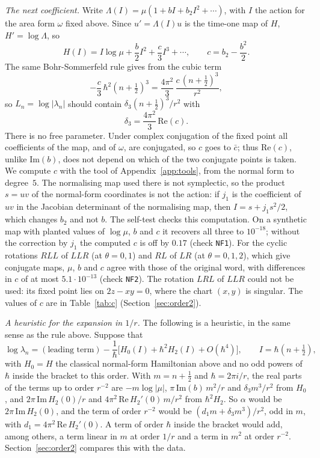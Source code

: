 \documentclass[11pt]{amsart}
\theoremstyle{definition}
\theoremstyle{remark}
\begin{document}
\emph{The next coefficient.} Write $\Lambda(I) = \mu(1 + bI + b_2I^2 + \cdots)$, with
$I$ the action for the area form $\omega$ fixed above. Since $u' = \Lambda(I)u$ is the
time-one map of $H$, $H' = \log\Lambda$, so
\[
H(I) = I\log\mu + \frac{b}{2}I^2 + \frac{c}{3}I^3 + \cdots, \qquad c = b_2 - \frac{b^2}{2}.
\]
The same Bohr-Sommerfeld rule gives from the cubic term
\[
-\frac{c}{3}\,\hbar^2\left(n+\tfrac12\right)^3 = \frac{4\pi^2}{3}\,
\frac{c\,(n+\frac12)^3}{r^2},
\]
so $L_n = \log|\lambda_n|$ should contain $\delta_3(n+\frac12)^3/r^2$ with
\begin{equation}\label{eq:delta3}
\delta_3 = \frac{4\pi^2}{3}\,\mathrm{Re}(c).
\end{equation}
There is no free parameter. Under complex conjugation of the fixed point all
coefficients of the map, and of $\omega$, are conjugated, so $c$ goes to $\bar c$; thus
$\mathrm{Re}(c)$, unlike $\mathrm{Im}(b)$, does not depend on which of the two
conjugate points is taken. We compute $c$ with the tool of Appendix~\ref{app:tools},
from the normal form to degree~$5$. The normalising map used there is not symplectic,
so the product $s = uv$ of the normal-form coordinates is not the action: if $j_1$ is
the coefficient of $uv$ in the Jacobian determinant of the normalising map, then
$I = s + j_1 s^2/2$, which changes $b_2$ and not $b$. The self-test checks this
computation. On a synthetic map with planted values of $\log\mu$, $b$ and $c$ it
recovers all three to $10^{-18}$; without the correction by $j_1$ the computed $c$ is
off by $0.17$ (check \texttt{NF1}). For the cyclic rotations $RLL$ of $LLR$ (at
$\theta = 0, 1$) and $RL$ of $LR$ (at $\theta = 0, 1, 2$), which give conjugate maps,
$\mu$, $b$ and $c$ agree with those of the original word, with differences in $c$ of
at most $5.1\cdot10^{-13}$ (check \texttt{NF2}). The rotation $LRL$ of $LLR$ could not
be used: its fixed point lies on $2z - xy = 0$, where the chart $(x,y)$ is singular.
The values of $c$ are in Table~\ref{tab:c} (Section~\ref{sec:order2}).

\emph{A heuristic for the expansion in $1/r$.} The following is a heuristic, in the
same sense as the rule above. Suppose that
\[
\log\lambda_n = (\text{leading term}) - \frac{1}{\hbar}\Big[H_0(I) + \hbar^2 H_2(I)
+ O(\hbar^4)\Big], \qquad I = \hbar\left(n+\tfrac12\right),
\]
with $H_0 = H$ the classical normal-form Hamiltonian above and no odd powers of
$\hbar$ inside the bracket to this order. With $m = n + \frac12$ and
$\hbar = 2\pi i/r$, the real parts of the terms up to order $r^{-2}$ are
$-m\log|\mu|$, $\pi\,\mathrm{Im}(b)\,m^2/r$ and $\delta_3 m^3/r^2$ from $H_0$, and
$2\pi\,\mathrm{Im}\,H_2(0)/r$ and $4\pi^2\,\mathrm{Re}\,H_2'(0)\,m/r^2$ from
$\hbar^2H_2$. So $\alpha$ would be $2\pi\,\mathrm{Im}\,H_2(0)$, and the term of order
$r^{-2}$ would be $(d_1 m + \delta_3 m^3)/r^2$, odd in $m$, with
$d_1 = 4\pi^2\,\mathrm{Re}\,H_2'(0)$. A term of order $\hbar$ inside the bracket would
add, among others, a term linear in $m$ at order $1/r$ and a term in $m^2$ at order
$r^{-2}$. Section~\ref{sec:order2} compares this with the data.
\end{document}
